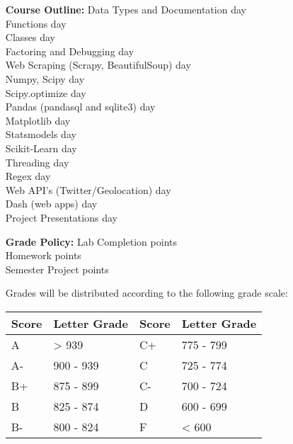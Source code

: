 \documentclass[12pt, margin=.5in]{article}
\begin{document}
\begin{itemize}
\vspace*{.15in}
\item[\textbf{Course Outline:}]
Data Types and Documentation  day\\
Functions  day\\
Classes  day\\
Factoring and Debugging  day\\
Web Scraping (Scrapy, BeautifulSoup)  day\\
Numpy, Scipy  day\\
Scipy.optimize  day\\
Pandas (pandasql and sqlite3)  day\\
Matplotlib  day\\
Statsmodels  day\\
Scikit-Learn  day\\
Threading  day\\
Regex  day\\
Web API's (Twitter/Geolocation)  day\\
Dash (web apps)  day\\
Project Presentations  day\\





\vspace*{.15in}
\item[\textbf{Grade Policy:}] 
Lab Completion  points\\
Homework  points\\
Semester Project  points

\vspace*{1em}
Grades will be distributed according to the following grade scale: \\

\begin{tabular}{l|l|l|l}
Score & Letter Grade & Score & Letter Grade\\
\hline
A & > 939 & C+ & 775 - 799 \\
A- & 900 - 939 & C & 725 - 774 \\
B+ & 875 - 899 & C- & 700 - 724 \\
B & 825 - 874 & D & 600 - 699 \\
B- & 800 - 824 & F & < 600 \\
\end{tabular}



\end{itemize}
\end{document}

